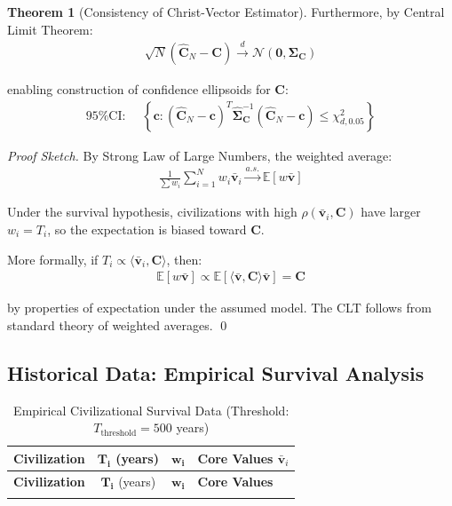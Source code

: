 \documentclass[11pt,a4paper]{article}
\theoremstyle{definition}
\newtheorem{theorem}{Theorem}[section]
\theoremstyle{remark}
\begin{document}
\begin{small}
\begin{theorem}[Consistency of Christ-Vector Estimator]
Furthermore, by Central Limit Theorem:
\begin{align}
\sqrt{N}(\hat{\mathbf{C}}_N - \mathbf{C}) \xrightarrow{d} \mathcal{N}(\mathbf{0}, \boldsymbol{\Sigma}_{\mathbf{C}})
\end{align}

enabling construction of confidence ellipsoids for \(\mathbf{C}\):
\begin{align}
\text{95\% CI: } \quad \left\{\mathbf{c} : (\hat{\mathbf{C}}_N - \mathbf{c})^T \hat{\boldsymbol{\Sigma}}_{\mathbf{C}}^{-1} (\hat{\mathbf{C}}_N - \mathbf{c}) \leq \chi^2_{d, 0.05}\right\}
\end{align}
\end{theorem}

\begin{proof}[Proof Sketch]
By Strong Law of Large Numbers, the weighted average:
\begin{align}
\frac{1}{\sum w_i}\sum_{i=1}^N w_i \bar{\mathbf{v}}_i \xrightarrow{a.s.} \mathbb{E}[w \bar{\mathbf{v}}]
\end{align}

Under the survival hypothesis, civilizations with high \(\rho(\bar{\mathbf{v}}_i, \mathbf{C})\) have larger \(w_i = T_i\), so the expectation is biased toward \(\mathbf{C}\).

More formally, if \(T_i \propto \langle \bar{\mathbf{v}}_i, \mathbf{C} \rangle\), then:
\begin{align}
\mathbb{E}[w \bar{\mathbf{v}}] \propto \mathbb{E}[\langle \bar{\mathbf{v}}, \mathbf{C} \rangle \bar{\mathbf{v}}] = \mathbf{C}
\end{align}

by properties of expectation under the assumed model. The CLT follows from standard theory of weighted averages. \qed
\end{proof}

\subsection{Historical Data: Empirical Survival Analysis}

\begin{longtable}{|l|c|c|p{5cm}|}
\caption{Empirical Civilizational Survival Data (Threshold: \(T_{\text{threshold}} = 500\) years)} \label{tab:survival_data} \\
\hline
\textbf{Civilization} & \(\mathbf{T_i}\) (years) & \(\mathbf{w_i}\) & \textbf{Core Values \(\bar{\mathbf{v}}_i\)} \\
\hline
\endfirsthead
\hline
\textbf{Civilization} & \(\mathbf{T_i}\) (years) & \(\mathbf{w_i}\) & \textbf{Core Values} \\
\hline
\endhead
\hline
\endfoot


\end{longtable}
\end{small}
\end{document}
